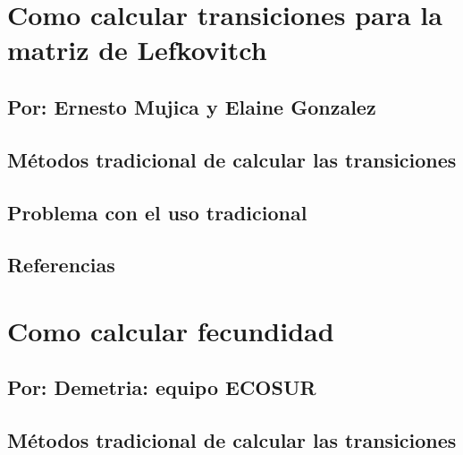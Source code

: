 \documentclass[
]{book}
\theoremstyle{definition}
\theoremstyle{definition}
\theoremstyle{definition}
\theoremstyle{definition}
\theoremstyle{remark}
\begin{document}
\hypertarget{como-calcular-transiciones-para-la-matriz-de-lefkovitch}{%
\chapter{Como calcular transiciones para la matriz de Lefkovitch}\label{como-calcular-transiciones-para-la-matriz-de-lefkovitch}}

\hypertarget{por-ernesto-mujica-y-elaine-gonzalez}{%
\section{Por: Ernesto Mujica y Elaine Gonzalez}\label{por-ernesto-mujica-y-elaine-gonzalez}}

\hypertarget{muxe9todos-tradicional-de-calcular-las-transiciones}{%
\section{Métodos tradicional de calcular las transiciones}\label{muxe9todos-tradicional-de-calcular-las-transiciones}}

\hypertarget{problema-con-el-uso-tradicional}{%
\section{Problema con el uso tradicional}\label{problema-con-el-uso-tradicional}}

\hypertarget{referencias-3}{%
\section{Referencias}\label{referencias-3}}

\hypertarget{como-calcular-fecundidad}{%
\chapter{Como calcular fecundidad}\label{como-calcular-fecundidad}}

\hypertarget{por-demetria-equipo-ecosur}{%
\section{Por: Demetria: equipo ECOSUR}\label{por-demetria-equipo-ecosur}}

\hypertarget{muxe9todos-tradicional-de-calcular-las-transiciones-1}{%
\section{Métodos tradicional de calcular las transiciones}\label{muxe9todos-tradicional-de-calcular-las-transiciones-1}}
\end{document}
